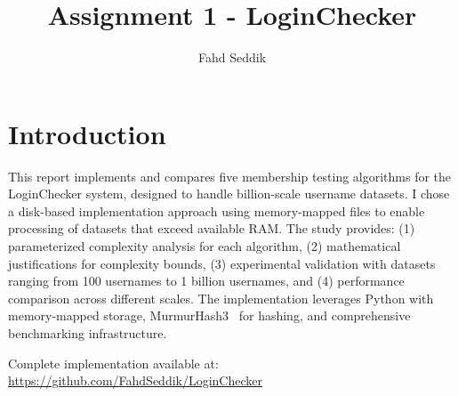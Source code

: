 \documentclass[sigconf]{acmart}
\begin{document}
\title{Assignment 1 - LoginChecker}

\author{Fahd Seddik}

\maketitle


\section{Introduction}
This report implements and compares five membership testing algorithms for the LoginChecker system, designed to handle billion-scale username datasets. I chose a disk-based implementation approach using memory-mapped files to enable processing of datasets that exceed available RAM. The study provides: (1) parameterized complexity analysis for each algorithm, (2) mathematical justifications for complexity bounds, (3) experimental validation with datasets ranging from 100 usernames to 1 billion usernames, and (4) performance comparison across different scales. The implementation leverages Python with memory-mapped storage, MurmurHash3~\cite{mmh3docs} for hashing, and comprehensive benchmarking infrastructure.

Complete implementation available at: \textcolor{blue}{\url{https://github.com/FahdSeddik/LoginChecker}}~\cite{loginchecker}
\end{document}
